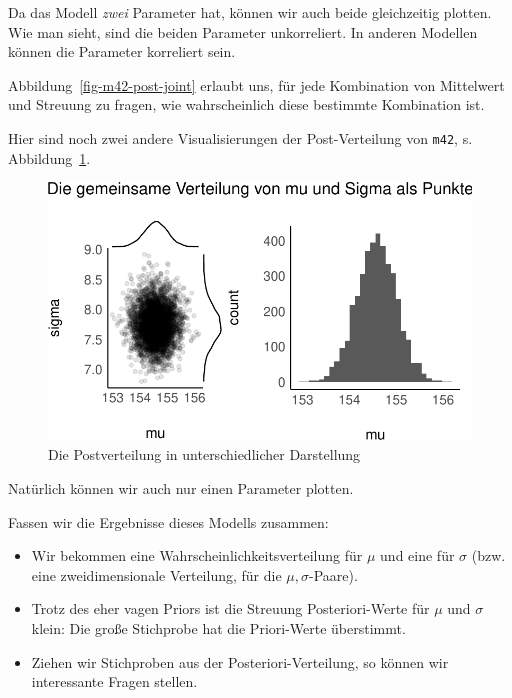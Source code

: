 \documentclass[
  a4paper,
  DIV=11]{scrreprt}
\theoremstyle{definition}
\theoremstyle{remark}
\begin{document}
Da das Modell \emph{zwei} Parameter hat, können wir auch beide
gleichzeitig plotten. Wie man sieht, sind die beiden Parameter
unkorreliert. In anderen Modellen können die Parameter korreliert sein.

Abbildung~\ref{fig-m42-post-joint} erlaubt uns, für jede Kombination von
Mittelwert und Streuung zu fragen, wie wahrscheinlich diese bestimmte
Kombination ist.

Hier sind noch zwei andere Visualisierungen der Post-Verteilung von
\texttt{m42}, s. Abbildung~\ref{fig-m42-post-anders}.

\begin{figure}

{\centering \includegraphics{./gauss_files/figure-pdf/fig-m42-post-anders-1.pdf}

}

\caption{\label{fig-m42-post-anders}Die Postverteilung in
unterschiedlicher Darstellung}

\end{figure}

Natürlich können wir auch nur einen Parameter plotten.

Fassen wir die Ergebnisse dieses Modells zusammen:

\begin{itemize}
\item
  Wir bekommen eine Wahrscheinlichkeitsverteilung für \(\mu\) und eine
  für \(\sigma\) (bzw. eine zweidimensionale Verteilung, für die
  \(\mu,\sigma\)-Paare).
\item
  Trotz des eher vagen Priors ist die Streuung Posteriori-Werte für
  \(\mu\) und \(\sigma\) klein: Die große Stichprobe hat die
  Priori-Werte überstimmt.
\item
  Ziehen wir Stichproben aus der Posteriori-Verteilung, so können wir
  interessante Fragen stellen.
\end{itemize}
\end{document}
